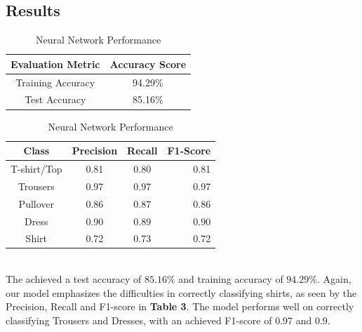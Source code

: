\subsection{Results}\label{subsec:results}
\begin{table}[!ht]
\begin{subtable}[c]{0.4\textwidth}
\footnotesize
\centering
\begin{tabular}{ c | c }
 \toprule
 Evaluation Metric & Accuracy Score  \\
 \midrule
 Training Accuracy & 94.29\% \\
 Test Accuracy & 85.16\% \\
 \bottomrule
\end{tabular}
\captionsetup{justification=centering,margin=1cm}
\end{subtable}
\begin{subtable}[c]{0.6\textwidth}
\footnotesize
\centering
\begin{tabular}{c | c c r}
Class & Precision & Recall & F1-Score\\
\midrule
T-shirt/Top   &    0.81  &    0.80  &    0.81 \\
Trousers   &    0.97  &    0.97  &    0.97 \\
Pullover   &    0.86  &    0.87  &    0.86\\
Dress   &    0.90  &    0.89  &    0.90\\
Shirt   &    0.72  &    0.73  &    0.72\\
\end{tabular}
\captionsetup{justification=centering,margin=1cm}
\end{subtable}
\caption{Neural Network Performance}
\label{nn_evaluation}
\end{table}\\

The  achieved a test accuracy of $85.16\%$ and training accuracy of $94.29\%$.
Again, our model emphasizes the difficulties in correctly classifying shirts, as seen by the Precision, Recall and F1-score in \textbf{Table 3}.
The model performs well on correctly classifying Trousers and Dresses, with an achieved F1-score of 0.97 and 0.9.







